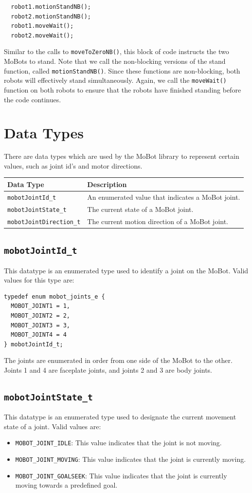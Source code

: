 \documentclass{article}
\begin{document}
\begin{verbatim}
  robot1.motionStandNB();
  robot2.motionStandNB();
  robot1.moveWait();
  robot2.moveWait();
\end{verbatim}
Similar to the calls to \texttt{moveToZeroNB()}, this block of code instructs 
the two MoBots to stand. Note that we call the non-blocking versions of the
stand function, called \texttt{motionStandNB()}. Since these functions are
non-blocking, both robots will effectively stand simultaneously. Again,
we call the \texttt{moveWait()} function on both robots to ensure that 
the robots have finished standing before the code continues.

\newpage
\appendix
\section{Data Types}
There are data types which are used by the MoBot library to represent 
certain values, such as joint id's and motor directions.

\begin{tabular}{p{3.5cm}p{7cm}} \hline 
Data Type& Description \\
\hline 
\texttt{mobotJointId\_t} & An enumerated value that indicates a MoBot joint. \\
\texttt{mobotJointState\_t} & The current state of a MoBot joint. \\
\texttt{mobotJointDirection\_t} & The current motion direction of a MoBot joint. 
\end{tabular}

\subsection{\label{sec:mobotJointId_t}\texttt{mobotJointId\_t}}
This datatype is an enumerated type used to identify a joint on the MoBot. Valid
values for this type are:
\begin{verbatim}
typedef enum mobot_joints_e {
  MOBOT_JOINT1 = 1,
  MOBOT_JOINT2 = 2,
  MOBOT_JOINT3 = 3,
  MOBOT_JOINT4 = 4
} mobotJointId_t;
\end{verbatim}
The joints are enumerated in order from one side of the MoBot to the other. Joints 1 and 4
are faceplate joints, and joints 2 and 3 are body joints.

\subsection{\label{sec:mobotJointState_t}\texttt{mobotJointState\_t}}
This datatype is an enumerated type used to designate the current 
movement state of a joint. Valid values are:
\begin{itemize}
\item \texttt{MOBOT\_JOINT\_IDLE}: This value indicates that the joint is not moving.
\item \texttt{MOBOT\_JOINT\_MOVING}: This value indicates that the joint is currently moving.
\item \texttt{MOBOT\_JOINT\_GOALSEEK}: This value indicates that the joint is currently moving
  towards a predefined goal.
\end{itemize}
\end{document}
